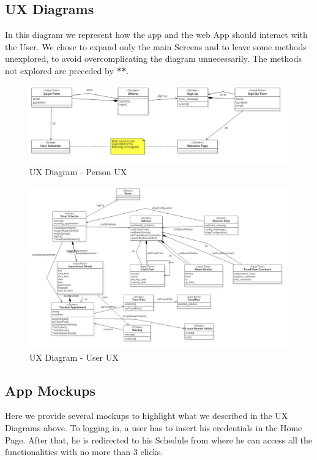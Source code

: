 \subsection{UX Diagrams}
In this diagram we represent how the app and the web App should interact with the User. We chose to expand only the main Screens and to leave some methods unexplored, to avoid overcomplicating the diagram unnecessarily. The methods not explored are preceded by \textbf{**}.

	\begin{figure}[H]	
		\centerline{\includegraphics[width=0.9\paperwidth]{Images/UxPerson}}
		\caption{UX Diagram - Person UX}
	\end{figure}	
	\begin{figure}[H]	
		\centerline{\includegraphics[width=0.9\paperwidth]{Images/UxUser}}
		\caption{UX Diagram - User UX}
	\end{figure}

\subsection{App Mockups}
Here we provide several mockups to highlight what we described in the UX Diagrams above. To logging in, a user has to insert his credentials in the Home Page. After that, he is redirected to his Schedule from where he can access all the functionalities with no more than 3 clicks.

